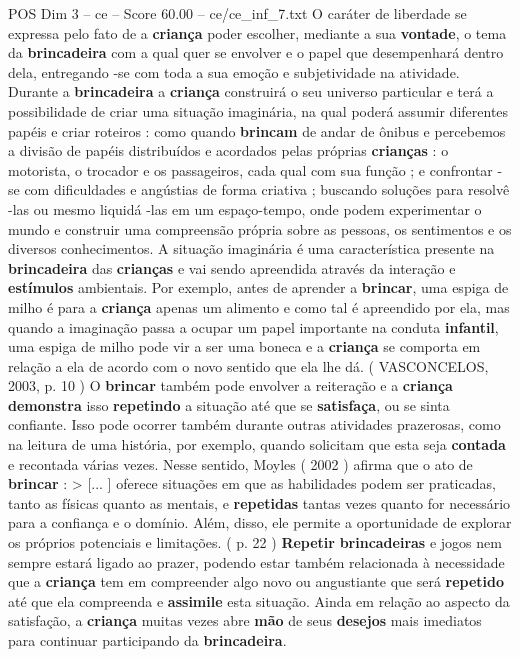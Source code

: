 \begin{textsample}{POS Dim 3 – ce – Score 60.00 – ce/ce\_inf\_7.txt}
O caráter de liberdade se expressa pelo fato de a \textbf{criança} poder escolher, mediante a sua \textbf{vontade}, o tema da \textbf{brincadeira} com a qual quer se envolver e o papel que desempenhará dentro dela, entregando -se com toda a sua emoção e subjetividade na atividade.
Durante a \textbf{brincadeira} a \textbf{criança} construirá o seu universo particular e terá a possibilidade de criar uma situação imaginária, na qual poderá assumir diferentes papéis e criar roteiros : como quando \textbf{brincam} de andar de ônibus e percebemos a divisão de papéis distribuídos e acordados pelas próprias \textbf{crianças} : o motorista, o trocador e os passageiros, cada qual com sua função ; e confrontar -se com dificuldades e angústias de forma criativa ; buscando soluções para resolvê -las ou mesmo liquidá -las em um espaço-tempo, onde podem experimentar o mundo e construir uma compreensão própria sobre as pessoas, os sentimentos e os diversos conhecimentos.
A situação imaginária é uma característica presente na \textbf{brincadeira} das \textbf{crianças} e vai sendo apreendida através da interação e \textbf{estímulos} ambientais.
Por exemplo, antes de aprender a \textbf{brincar}, uma espiga de milho é para a \textbf{criança} apenas um alimento e como tal é apreendido por ela, mas quando a imaginação passa a ocupar um papel importante na conduta \textbf{infantil}, uma espiga de milho pode vir a ser uma boneca e a \textbf{criança} se comporta em relação a ela de acordo com o novo sentido que ela lhe dá. ( VASCONCELOS, 2003, p. 10 ) O \textbf{brincar} também pode envolver a reiteração e a \textbf{criança} \textbf{demonstra} isso \textbf{repetindo} a situação até que se \textbf{satisfaça}, ou se sinta confiante.
Isso pode ocorrer também durante outras atividades prazerosas, como na leitura de uma história, por exemplo, quando solicitam que esta seja \textbf{contada} e recontada várias vezes.
Nesse sentido, Moyles ( 2002 ) afirma que o ato de \textbf{brincar} : > [... ] oferece situações em que as habilidades podem ser praticadas, tanto as físicas quanto as mentais, e \textbf{repetidas} tantas vezes quanto for necessário para a confiança e o domínio.
Além, disso, ele permite a oportunidade de explorar os próprios potenciais e limitações. ( p. 22 ) \textbf{Repetir} \textbf{brincadeiras} e jogos nem sempre estará ligado ao prazer, podendo estar também relacionada à necessidade que a \textbf{criança} tem em compreender algo novo ou angustiante que será \textbf{repetido} até que ela compreenda e \textbf{assimile} esta situação.
Ainda em relação ao aspecto da satisfação, a \textbf{criança} muitas vezes abre \textbf{mão} de seus \textbf{desejos} mais imediatos para continuar participando da \textbf{brincadeira}.

\end{textsample}
